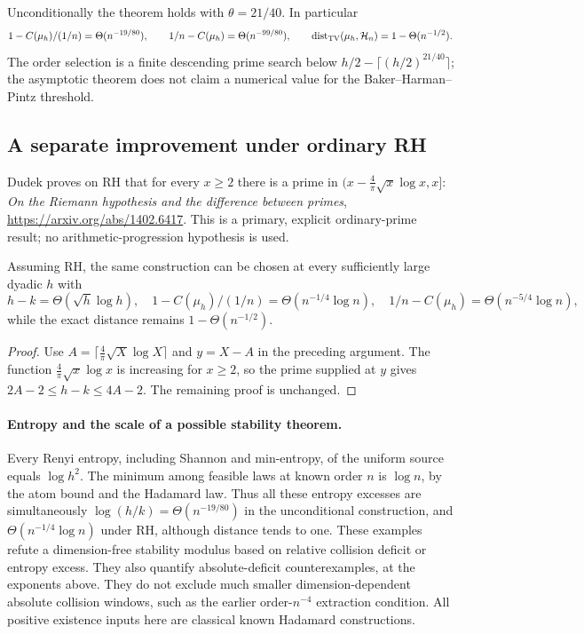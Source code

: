 \begin{corollary}
\label{s26:cor:stability-bhp-rate}
Unconditionally the theorem holds with $\theta=21/40$. In particular
\[
 1-C(\mu_h)/(1/n)=\Theta(n^{-19/80}),\qquad
 1/n-C(\mu_h)=\Theta(n^{-99/80}),\qquad
 \operatorname{dist}_{\rm TV}(\mu_h,\mathcal H_n)=1-\Theta(n^{-1/2}).
\]
The order selection is a finite descending prime search below
$h/2-\lceil(h/2)^{21/40}\rceil$; the asymptotic theorem does not claim
a numerical value for the Baker--Harman--Pintz threshold.
\end{corollary}

\subsection{A separate improvement under ordinary RH}
Dudek proves on RH that for every $x\ge2$ there is a prime in
$(x-\frac4\pi\sqrt{x}\log x,x]$:
\emph{On the Riemann hypothesis and the difference between primes},
\url{https://arxiv.org/abs/1402.6417}. This is a primary, explicit
ordinary-prime result; no arithmetic-progression hypothesis is used.
\begin{corollary}\label{s26:cor:stability-rh-rate}
Assuming RH, the same construction can be chosen at every sufficiently
large dyadic $h$ with
\[
 h-k=\Theta(\sqrt h\log h),\quad
 1-C(\mu_h)/(1/n)=\Theta(n^{-1/4}\log n),\quad
 1/n-C(\mu_h)=\Theta(n^{-5/4}\log n),
\]
while the exact distance remains $1-\Theta(n^{-1/2})$.
\end{corollary}
\begin{proof}
Use $A=\lceil\frac4\pi\sqrt X\log X\rceil$ and $y=X-A$ in the
preceding argument. The function $\frac4\pi\sqrt x\log x$ is increasing
for $x\ge2$, so the prime supplied at $y$ gives
$2A-2\le h-k\le4A-2$. The remaining proof is unchanged.
\end{proof}

\paragraph{Entropy and the scale of a possible stability theorem.}
Every Renyi entropy, including Shannon and min-entropy, of the uniform
source equals $\log h^2$. The minimum among feasible laws at known order
$n$ is $\log n$, by the atom bound and the Hadamard law. Thus all these
entropy excesses are simultaneously
$\log(h/k)=\Theta(n^{-19/80})$ in the unconditional construction,
and $\Theta(n^{-1/4}\log n)$ under RH, although distance tends to one.
These examples refute a dimension-free stability modulus based on relative
collision deficit or entropy excess. They also quantify absolute-deficit
counterexamples, at the exponents above. They do not exclude much smaller
dimension-dependent absolute collision windows, such as the earlier
order-$n^{-4}$ extraction condition. All positive existence inputs here
are classical known Hadamard constructions.

